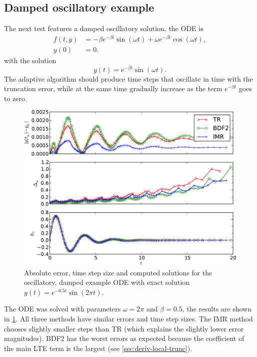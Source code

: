 \subsection{Damped oscillatory example}
\label{sec:oscill-damp-example}

The next test features a damped oscillatory solution, the ODE is
\begin{equation}
  \label{eqn:imr-test-osc-damp}
  \begin{aligned}
    f(t,y) &= - \beta e^{-\beta t} \sin(\omega t) + \omega e^{-\beta t} \cos(\omega t), \\
    y(0) &= 0.
  \end{aligned}
\end{equation}
with the solution
\begin{equation}
  y(t) = e^{-\beta t} \sin(\omega t).
\end{equation}
The adaptive algorithm should produce time steps that oscillate in time with the truncation error, while at the same time gradually increase as the term $e^{-\beta t}$ goes to zero.

\begin{figure}
  \centering \includegraphics[width=1\textwidth]{plots/aimr_odes_traces/damped_oscillation-errornormsvs-dtsvs-tracevaluesvstimes}
  \caption{Absolute error, time step size and computed solutions for the oscillatory, damped example ODE with exact solution $y(t) = e^{-0.5t} \sin(2\pi t)$.}
  \label{fig:imr-osc-example}
\end{figure}

The ODE was solved with parameters $\omega = 2 \pi$ and $\beta = 0.5$, the results are shown in \cref{fig:imr-osc-example}.
All three methods have similar errors and time step sizes.
The IMR method chooses slightly smaller steps than TR (which explains the slightly lower error magnitudes).
BDF2 has the worst errors as expected because the coefficient of the main LTE term is the largest (see \cref{sec:deriv-local-trunc}).

